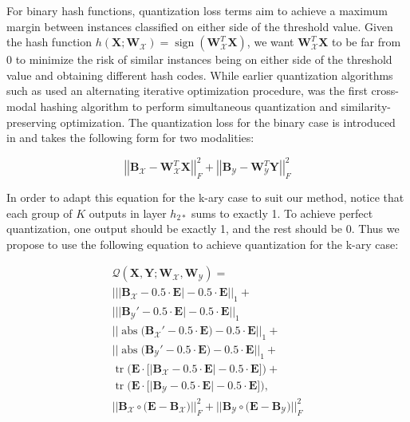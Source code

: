 \documentclass[letterpaper]{article}
\DeclareMathOperator{\sign}{sign}
\DeclareMathOperator{\trace}{tr}
\DeclareMathOperator{\abs}{abs}
\newcommand{\bpx}{\mathbf{B_\mathcal{X}}}
\newcommand{\bpy}{\mathbf{B_\mathcal{Y}}}
\newcommand{\WX}{\mathbf{W}_\mathcal{X}}
\newcommand{\WY}{\mathbf{W}_\mathcal{Y}}
\newcommand{\X}{\mathbf{X}}
\newcommand{\Y}{\mathbf{Y}}
\begin{document}
For binary hash functions, quantization loss terms aim to achieve a maximum margin between instances classified on either side of the threshold value. Given the hash function $ h(\X; \WX) = \sign(\WX^T\X) $, we want $ \WX^T\X $ to be far from 0 to minimize the risk of similar instances being on either side of the threshold value and obtaining different hash codes. While earlier quantization algorithms such as \cite{itq,acq} used an alternating iterative optimization procedure, \cite{qch} was the first cross-modal hashing algorithm to perform simultaneous quantization and similarity-preserving optimization. The quantization loss for the binary case is introduced in \cite{itq} and takes the following form for two modalities:

\begin{equation}
\label{eq:binaryQuant}
\left|\left| \mathbf{B}_\mathcal{X} - \WX^T\X \right|\right|^2_F + \left|\left| \mathbf{B}_\mathcal{Y} - \WY^T\Y \right|\right|^2_F
\end{equation}

In order to adapt this equation for the k-ary case to suit our method, notice that each group of $ K $ outputs in layer $ h_{2*} $ sums to exactly 1. To achieve perfect quantization, one output should be exactly 1, and the rest should be 0. Thus we propose to use the following equation to achieve quantization for the k-ary case:

\begin{equation}
\label{eq:karyQuant}
\begin{gathered}
\mathcal{Q}(\X,\Y; \WX, \WY) = \\
\Big|\Big| \big| \bpx - 0.5 \cdot\mathbf{E}\big| - 0.5 \cdot \mathbf{E} \Big|\Big|_1 + \\
\Big|\Big| \big| \bpy' - 0.5 \cdot\mathbf{E}\big| - 0.5 \cdot \mathbf{E} \Big|\Big|_1 \\
\Big|\Big| \abs\big( \bpx' - 0.5 \cdot\mathbf{E}\big) - 0.5 \cdot \mathbf{E} \Big|\Big|_1 + \\
\Big|\Big| \abs\big( \bpy' - 0.5 \cdot\mathbf{E}\big) - 0.5 \cdot \mathbf{E} \Big|\Big|_1 + \\
\trace\Big(\mathbf{E} \cdot \Big[ \big| \bpx - 0.5 \cdot\mathbf{E}\big| - 0.5 \cdot \mathbf{E} \Big] \Big) + \\
\trace\Big(\mathbf{E} \cdot \Big[ \big| \bpy - 0.5 \cdot\mathbf{E}\big| - 0.5 \cdot \mathbf{E} \Big] \Big), \\
\big|\big| \bpx \circ \big(\mathbf{E} - \bpx \big) \big|\big|_F^2 + \big|\big| \bpy \circ \big(\mathbf{E} - \bpy \big) \big|\big|_F^2
\end{gathered}
\end{equation}
\end{document}
